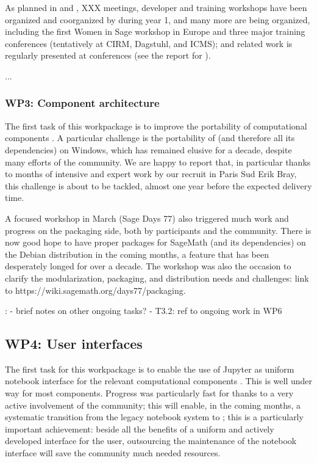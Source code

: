 \documentclass{deliverablereport}
\newcommand{\TODO}[1]{{\color{red}{TODO}: #1}}
\begin{document}
As planned in  and
, XXX meetings, developer and training
workshops have been organized and coorganized by \ODK during year 1,
and many more are being organized, including the first Women in Sage
workshop in Europe and three major training conferences (tentatively
at CIRM, Dagstuhl, and ICMS); \ODK and \ODK related work is regularly
presented at conferences (see the report for
).

...

\subsubsection{WP3: Component architecture}

The first task of this workpackage is to improve the portability of
computational components
. A particular challenge
is the portability of \Sage (and therefore all its dependencies)
on Windows, which has remained elusive for a decade, despite many
efforts of the community. We are happy to report that, in particular
thanks to months of intensive and expert work by our recruit in Paris
Sud Erik Bray, this challenge is about to be tackled, almost one year
before the expected delivery time.

A focused workshop in March (Sage Days 77) also triggered much work
and progress on the packaging side, both by \ODK participants and the
community. There is now good hope to have proper packages for SageMath
(and its dependencies) on the Debian distribution in the coming
months, a feature that has been desperately longed for over a decade.
The workshop was also the occasion to clarify the modularization,
packaging, and distribution needs and challenges\TODO{link to
https://wiki.sagemath.org/days77/packaging}.

\TODO{
- brief notes on other ongoing tasks?
- T3.2: ref to ongoing work in WP6
}
\subsection{WP4: User interfaces}

The first task for this workpackage is to enable the use of Jupyter as
uniform notebook interface for the relevant computational components
. This is well under way for most
components. Progress was particularly fast for \Sage thanks to a
very active involvement of the community; this will enable, in the
coming months, a systematic transition from the legacy \Sage
notebook system to \Jupyter; this is a particularly important
achievement: beside all the benefits of a uniform and actively
developed interface for the user, outsourcing the maintenance of the
notebook interface will save the \Sage community much needed
resources.
\end{document}
